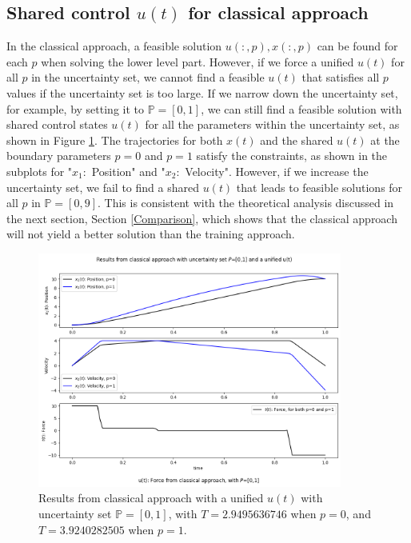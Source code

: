 \documentclass  [
  paper    = a4,
  BCOR     = 10mm,
  twoside,
  fontsize = 12pt,
  fleqn,
  toc      = bibnumbered,
  toc      = listofnumbered,
  numbers  = noendperiod,
  headings = normal,
  listof   = leveldown,
  version  = 3.03
]                                       {scrreprt}
\newcommand{\<}{\langle}
\renewcommand{\>}{\rangle}
\begin{document}
\subsection{Shared control $u(t)$ for classical approach}
\label{Sec_ShareUt}

In the classical approach, a feasible solution $u(:,p), x(:,p)$ can be found for each $p$ when solving the lower level part. However, if we force a unified $u(t)$ for all $p$ in the uncertainty set, we cannot find a feasible $u(t)$ that satisfies all $p$ values if the uncertainty set is too large. If we narrow down the uncertainty set, for example, by setting it to $\mathbb{P}=[0,1]$, we can still find a feasible solution with shared control states $u(t)$ for all the parameters within the uncertainty set, as shown in Figure \ref{fig1_ca_unifiedUt}. The trajectories for both $x(t)$ and the shared $u(t)$ at the boundary parameters $p=0$ and $p=1$ satisfy the constraints, as shown in the subplots for "$x_1:$ Position" and "$x_2:$ Velocity". However, if we increase the uncertainty set, we fail to find a shared $u(t)$ that leads to feasible solutions for all $p$ in $\mathbb{P}=[0,9]$. This is consistent with the theoretical analysis discussed in the next section, Section \ref{Comparison}, which shows that the classical approach will not yield a better solution than the training approach.



 \begin{figure}[H]
  	\centerline{\includegraphics[width=10cm]{aunified_ut.png}}
  	\caption{Results from classical approach with a unified $u(t)$ with uncertainty set  $ \mathbb{P}=[0,1]$, with $T=2.9495636746$ when $p=0$, and $T=3.9240282505$ when $p=1$. }
  	\label{fig1_ca_unifiedUt}
  \end{figure}
  
\end{document}
